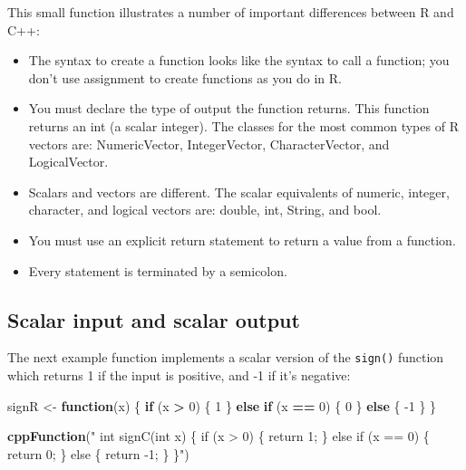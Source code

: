 \documentclass[]{krantz}
\makeatletter
\newenvironment{Shaded}{\begin{snugshade}}{\end{snugshade}}
\newcommand{\ControlFlowTok}[1]{\textcolor[rgb]{0.27,0.27,0.27}{\textbf{#1}}}
\newcommand{\DecValTok}[1]{\textcolor[rgb]{0.06,0.06,0.06}{#1}}
\newcommand{\KeywordTok}[1]{\textcolor[rgb]{0.27,0.27,0.27}{\textbf{#1}}}
\newcommand{\NormalTok}[1]{#1}
\newcommand{\OperatorTok}[1]{\textcolor[rgb]{0.43,0.43,0.43}{\textbf{#1}}}
\newcommand{\StringTok}[1]{\textcolor[rgb]{0.5,0.5,0.5}{#1}}
\providecommand{\tightlist}{%
  \setlength{\itemsep}{0pt}\setlength{\parskip}{0pt}}
\newenvironment{kframe}{%
\medskip{}
\setlength{\fboxsep}{.8em}
 \def\at@end@of@kframe{}%
 \ifinner\ifhmode%
  \def\at@end@of@kframe{\end{minipage}}%
  \begin{minipage}{\columnwidth}%
 \fi\fi%
 \def\FrameCommand##1{\hskip\@totalleftmargin \hskip-\fboxsep
 \colorbox{shadecolor}{##1}\hskip-\fboxsep
     \hskip-\linewidth \hskip-\@totalleftmargin \hskip\columnwidth}%
 \MakeFramed {\advance\hsize-\width
   \@totalleftmargin\z@ \linewidth\hsize
   \@setminipage}}%
 {\par\unskip\endMakeFramed%
 \at@end@of@kframe}
\renewenvironment{Shaded}{\begin{kframe}}{\end{kframe}}
\makeatother
\begin{document}
This small function illustrates a number of important differences between R and C++:

\begin{itemize}
\tightlist
\item
  The syntax to create a function looks like the syntax to call a function; you don't use assignment to create functions as you do in R.
\item
  You must declare the type of output the function returns. This function returns an int (a scalar integer). The classes for the most common types of R vectors are: NumericVector, IntegerVector, CharacterVector, and LogicalVector.
\item
  Scalars and vectors are different. The scalar equivalents of numeric, integer, character, and logical vectors are: double, int, String, and bool.
\item
  You must use an explicit return statement to return a value from a function.
\item
  Every statement is terminated by a semicolon.
\end{itemize}

\hypertarget{scalar-input-and-scalar-output}{%
\subsection{Scalar input and scalar output}\label{scalar-input-and-scalar-output}}

The next example function implements a scalar version of the \texttt{sign()} function which returns 1 if the input is positive, and -1 if it's negative:

\begin{Shaded}
\begin{Highlighting}[]
\NormalTok{signR <-}\StringTok{ }\ControlFlowTok{function}\NormalTok{(x) \{}
  \ControlFlowTok{if}\NormalTok{ (x }\OperatorTok{>}\StringTok{ }\DecValTok{0}\NormalTok{) \{}
    \DecValTok{1}
\NormalTok{  \} }\ControlFlowTok{else} \ControlFlowTok{if}\NormalTok{ (x }\OperatorTok{==}\StringTok{ }\DecValTok{0}\NormalTok{) \{}
    \DecValTok{0}
\NormalTok{  \} }\ControlFlowTok{else}\NormalTok{ \{}
    \DecValTok{-1}
\NormalTok{  \}}
\NormalTok{\}}

\KeywordTok{cppFunction}\NormalTok{(}\StringTok{"}
\StringTok{  int signC(int x) \{}
\StringTok{  if (x > 0) \{}
\StringTok{    return 1;}
\StringTok{  \} else if (x == 0) \{}
\StringTok{    return 0;}
\StringTok{  \} else \{}
\StringTok{    return -1;}
\StringTok{  \}}
\StringTok{  \}"}\NormalTok{)}
\end{Highlighting}
\end{Shaded}
\end{document}
